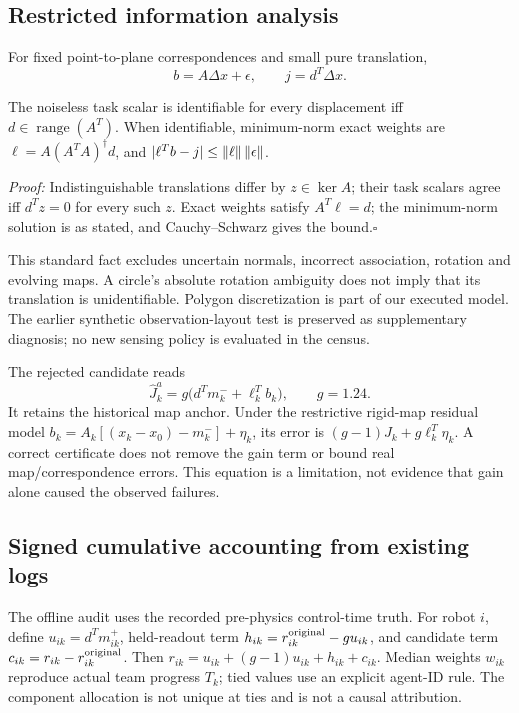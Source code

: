 \subsection{Restricted information analysis}
For fixed point-to-plane correspondences and small pure translation,
\begin{equation}
b=A\Delta x+\epsilon,\qquad j=d^T\Delta x.
\end{equation}
\begin{proposition}
The noiseless task scalar is identifiable for every displacement iff
$d\in\operatorname{range}(A^T)$. When identifiable, minimum-norm exact weights are
$\ell=A(A^TA)^\dagger d$, and
$|\ell^Tb-j|\leq\left\lVert\ell\right\rVert\left\lVert\epsilon\right\rVert$.
\end{proposition}
\noindent\emph{Proof:} Indistinguishable translations differ by $z\in\ker A$; their task scalars agree iff $d^Tz=0$ for every such $z$. Exact weights satisfy $A^T\ell=d$; the minimum-norm solution is as stated, and Cauchy--Schwarz gives the bound.\hfill$\square$

This standard fact excludes uncertain normals, incorrect association, rotation and evolving maps. A circle's absolute rotation ambiguity does not imply that its translation is unidentifiable. Polygon discretization is part of our executed model. The earlier synthetic observation-layout test is preserved as supplementary diagnosis; no new sensing policy is evaluated in the census.

The rejected candidate reads
\begin{equation}
\widehat J^{a}_k=g\bigl(d^Tm_k^-+\ell_k^Tb_k\bigr),\qquad g=1.24.
\end{equation}
It retains the historical map anchor. Under the restrictive rigid-map residual model
$b_k=A_k[(x_k-x_0)-m_k^-]+\eta_k$,
its error is $(g-1)J_k+g\ell_k^T\eta_k$.
A correct certificate does not remove the gain term or bound real map/correspondence errors. This equation is a limitation, not evidence that gain alone caused the observed failures.

\subsection{Signed cumulative accounting from existing logs}
The offline audit uses the recorded pre-physics control-time truth. For robot $i$, define $u_{ik}=d^Tm^+_{ik}$, held-readout term
$h_{ik}=r^{\rm original}_{ik}-gu_{ik}$, and candidate term
$c_{ik}=r_{ik}-r^{\rm original}_{ik}$. Then
$r_{ik}=u_{ik}+(g-1)u_{ik}+h_{ik}+c_{ik}$.
Median weights $w_{ik}$ reproduce actual team progress $T_k$; tied values use an explicit agent-ID rule. The component allocation is not unique at ties and is not a causal attribution.

